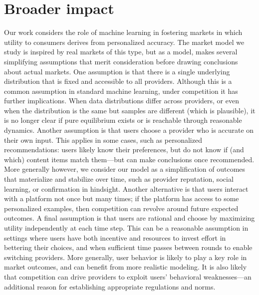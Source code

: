 \section*{Broader impact}

Our work considers the role of machine learning in fostering markets
in which utility to consumers derives from personalized accuracy.
The market model we study is inspired by real markets of this type,
but as a model, makes several simplifying assumptions
that merit consideration before drawing conclusions about actual markets.
One assumption is that there is a single underlying distribution that is fixed and accessible to all providers. 
Although this is a common assumption in standard machine learning,
under competition it has further implications.
When data distributions differ across providers,
or even when the distribution is the same but samples are different (which is plausible),
it is no longer clear if pure equilibrium exists or is reachable through reasonable dynamics.
Another assumption is that users choose a provider who is accurate on their own input.
This applies in some cases, such as personalized recommendations:
users likely know their preferences, but do not know if (and which) content items match them---but can make conclusions once recommended.
More generally however, we consider our model as a simplification of outcomes that materialize and stabilize over time,
such as provider reputation, social learning, or confirmation in hindsight.
Another alternative is that users interact with a platform not once but many times;
if the platform has access to some personalized examples,
then competition can revolve around future expected outcomes.
A final assumption is that users are rational and choose by maximizing utility
independently at each time step.
This can be a reasonable assumption in settings where users have
both incentive and resources to invest effort in bettering their choices,
and when sufficient time passes between rounds to enable switching providers.
More generally, user behavior is likely to play a key role in market outcomes,
and can benefit from more realistic modeling.
It is also likely that competition can drive providers to exploit
users' behavioral weaknesses---an additional reason for establishing appropriate regulations and norms.



